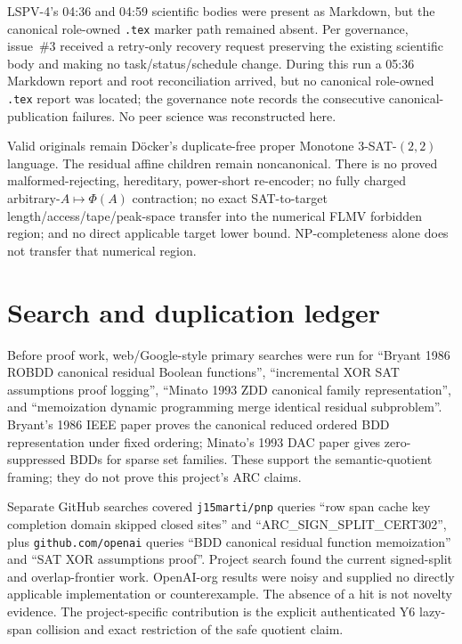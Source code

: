 \documentclass[11pt]{article}
\begin{document}
LSPV-4's 04:36 and 04:59 scientific bodies were present as Markdown, but the canonical role-owned \texttt{.tex} marker path remained absent.  Per governance, issue~\#3 received a retry-only recovery request preserving the existing scientific body and making no task/status/schedule change.  During this run a 05:36 Markdown report and root reconciliation arrived, but no canonical role-owned \texttt{.tex} report was located; the governance note records the consecutive canonical-publication failures.  No peer science was reconstructed here.

Valid originals remain D\"ocker's duplicate-free proper Monotone 3-SAT-$(2,2)$ language.  The residual affine children remain noncanonical.  There is no proved malformed-rejecting, hereditary, power-short re-encoder; no fully charged arbitrary-$A\mapsto\Phi(A)$ contraction; no exact SAT-to-target length/access/tape/peak-space transfer into the numerical FLMV forbidden region; and no direct applicable target lower bound.  NP-completeness alone does not transfer that numerical region.

\section{Search and duplication ledger}
Before proof work, web/Google-style primary searches were run for ``Bryant 1986 ROBDD canonical residual Boolean functions'', ``incremental XOR SAT assumptions proof logging'', ``Minato 1993 ZDD canonical family representation'', and ``memoization dynamic programming merge identical residual subproblem''.  Bryant's 1986 IEEE paper proves the canonical reduced ordered BDD representation under fixed ordering; Minato's 1993 DAC paper gives zero-suppressed BDDs for sparse set families.  These support the semantic-quotient framing; they do not prove this project's ARC claims.

Separate GitHub searches covered \texttt{j15marti/pnp} queries ``row span cache key completion domain skipped closed sites'' and ``ARC\_SIGN\_SPLIT\_CERT302'', plus \texttt{github.com/openai} queries ``BDD canonical residual function memoization'' and ``SAT XOR assumptions proof''.  Project search found the current signed-split and overlap-frontier work.  OpenAI-org results were noisy and supplied no directly applicable implementation or counterexample.  The absence of a hit is not novelty evidence.  The project-specific contribution is the explicit authenticated Y6 lazy-span collision and exact restriction of the safe quotient claim.
\end{document}
